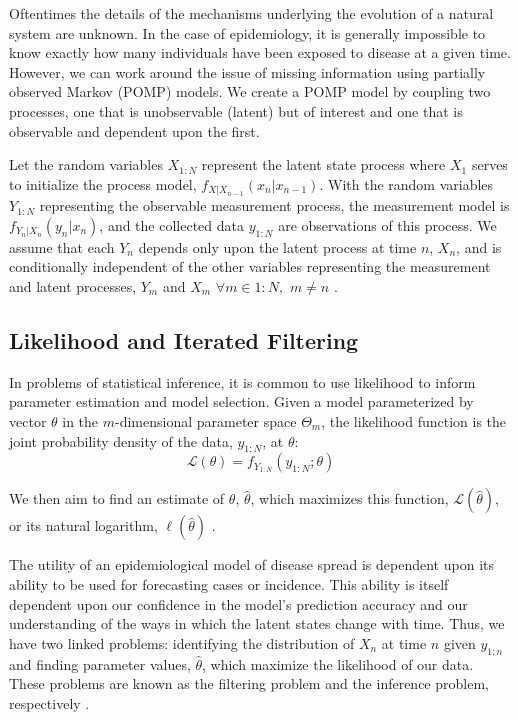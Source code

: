 \documentclass[12pt]{article}
\begin{document}
  Oftentimes the details of the mechanisms underlying the evolution of a natural system are unknown. In the case of epidemiology, it is generally impossible to know exactly how many individuals have been exposed to disease at a given time. However, we can work around the issue of missing information using partially observed Markov (POMP) models. We create a POMP model by coupling two processes, one that is unobservable (latent) but of interest and one that is observable and dependent upon the first.
  
  Let the random variables $X_{1:N}$ represent the latent state process where $X_1$ serves to initialize the process model, $f_{X|X_{n-1}}(x_n|x_{n-1})$. With the random variables $Y_{1:N}$ representing the observable measurement process, the measurement model is $f_{Y_n|X_n}(y_n|x_n)$, and the collected data $y_{1:N}$ are observations of this process. We assume that each $Y_n$ depends only upon the latent process at time $n$, $X_n$, and is conditionally independent of the other variables representing the measurement and latent processes, $Y_m$ and $X_m$ \hspace{1mm} $\forall m \in 1:N,$ \hspace{1mm} $m \ne n$ \cite{Shumway_ch6}.

\subsection{Likelihood and Iterated Filtering}

  In problems of statistical inference, it is common to use likelihood to inform parameter estimation and model selection. Given a model parameterized by vector $\theta$ in the $m$-dimensional parameter space $\Theta_m$, the likelihood function is the joint probability density of the data, $y_{1:N}$, at $\theta$:
        \begin{equation}
        \mathcal{L}(\theta) = f_{Y_{1:N}}(y_{1:N}; \theta)
        \end{equation}
        
  We then aim to find an estimate of $\theta$, $\hat{\theta}$, which maximizes this function, $\mathcal{L}(\hat{\theta})$, or its natural logarithm, $\mathbf{\ell}(\hat{\theta})$ \cite{Millar}. 
  
  The utility of an epidemiological model of disease spread is dependent upon its ability to be used for forecasting cases or incidence. This ability is itself dependent upon our confidence in the model's prediction accuracy and our understanding of the ways in which the latent states change with time. Thus, we have two linked problems: identifying the distribution of $X_{n}$ at time $n$ given $y_{1:n}$ and finding parameter values, $\hat{\theta}$, which maximize the likelihood of our data. These problems are known as the filtering problem and the inference problem, respectively \cite{crisan, Millar}.
  
\end{document}
